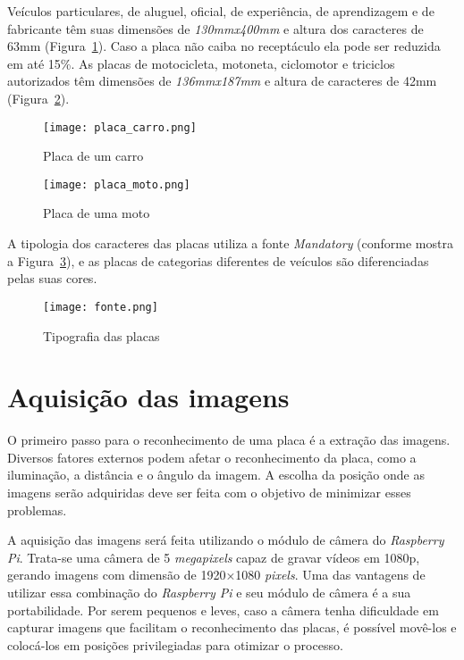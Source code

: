 Veículos particulares, de aluguel, oficial, de experiência, de aprendizagem e de
fabricante têm suas dimensões de \emph{130mmx400mm} e altura dos caracteres de
63mm (Figura~\ref{fig:placa_carro}).  Caso a placa não caiba no receptáculo ela
pode ser reduzida em até 15\%. As placas de motocicleta, motoneta, ciclomotor e
triciclos autorizados têm dimensões de \emph{136mmx187mm} e altura de caracteres
de 42mm (Figura~\ref{fig:placa_moto}).

\begin{figure}[H]
	\centering
	\texttt{[image: placa\_carro.png]}
	\caption{Placa de um carro}
	\label{fig:placa_carro}
\end{figure}

\begin{figure}[H]
	\centering
	\texttt{[image: placa\_moto.png]}
	\caption{Placa de uma moto}
	\label{fig:placa_moto}
\end{figure}

A tipologia dos caracteres das placas utiliza a fonte \emph{Mandatory} (conforme
mostra a Figura~\ref{fig:tipografia}), e as placas de categorias diferentes de
veículos são diferenciadas pelas suas cores.

\begin{figure}[H]
	\centering
	\texttt{[image: fonte.png]}
	\caption{Tipografia das placas}
	\label{fig:tipografia}
\end{figure}

\section{Aquisição das imagens}
\label{sec:aquisicao}

O primeiro passo para o reconhecimento de uma placa é a extração das imagens.
Diversos fatores externos podem afetar o reconhecimento da placa, como a
iluminação, a distância e o ângulo da imagem. A escolha da posição onde as
imagens serão adquiridas deve ser feita com o objetivo de minimizar esses
problemas.

A aquisição das imagens será feita utilizando o módulo de câmera do
\emph{Raspberry Pi}. Trata-se uma câmera de 5 \emph{megapixels} capaz de gravar
vídeos em 1080p, gerando imagens com dimensão de 1920×1080 \emph{pixels}. Uma
das vantagens de utilizar essa combinação do \emph{Raspberry Pi} e seu módulo de
câmera é a sua portabilidade. Por serem pequenos e leves, caso a câmera tenha
dificuldade em capturar imagens que facilitam o reconhecimento das placas, é
possível movê-los e colocá-los em posições privilegiadas para otimizar o
processo.

